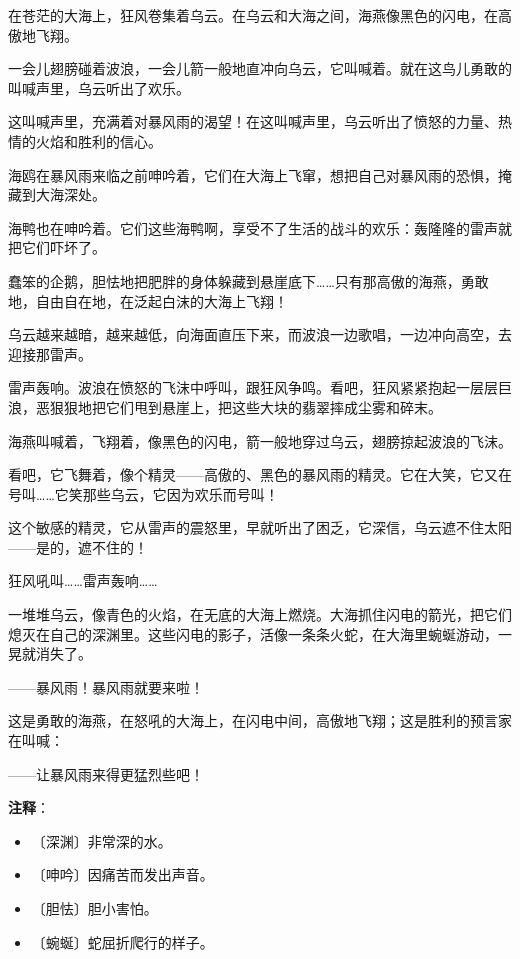 \documentclass[12pt,UTF-8,openany]{ctexbook}
\begin{document}
\begin{large}
    
    在苍茫的大海上，狂风卷集着乌云。在乌云和大海之间，海燕像黑色的闪电，在高傲地飞翔。
    
    一会儿翅膀碰着波浪，一会儿箭一般地直冲向乌云，它叫喊着。就在这鸟儿勇敢的叫喊声里，乌云听出了欢乐。
    
    这叫喊声里，充满着对暴风雨的渴望！在这叫喊声里，乌云听出了愤怒的力量、热情的火焰和胜利的信心。
    
    海鸥在暴风雨来临之前呻吟着，它们在大海上飞窜，想把自己对暴风雨的恐惧，掩藏到大海深处。
    
    海鸭也在呻吟着。它们这些海鸭啊，享受不了生活的战斗的欢乐：轰隆隆的雷声就把它们吓坏了。
    
    蠢笨的企鹅，胆怯地把肥胖的身体躲藏到悬崖底下……只有那高傲的海燕，勇敢地，自由自在地，在泛起白沫的大海上飞翔！
    
    乌云越来越暗，越来越低，向海面直压下来，而波浪一边歌唱，一边冲向高空，去迎接那雷声。
    
    雷声轰响。波浪在愤怒的飞沫中呼叫，跟狂风争鸣。看吧，狂风紧紧抱起一层层巨浪，恶狠狠地把它们甩到悬崖上，把这些大块的翡翠摔成尘雾和碎末。
    
    海燕叫喊着，飞翔着，像黑色的闪电，箭一般地穿过乌云，翅膀掠起波浪的飞沫。
    
    看吧，它飞舞着，像个精灵——高傲的、黑色的暴风雨的精灵。它在大笑，它又在号叫……它笑那些乌云，它因为欢乐而号叫！
    
    这个敏感的精灵，它从雷声的震怒里，早就听出了困乏，它深信，乌云遮不住太阳——是的，遮不住的！
    
    狂风吼叫……雷声轰响……
    
    一堆堆乌云，像青色的火焰，在无底的大海上燃烧。大海抓住闪电的箭光，把它们熄灭在自己的深渊里。这些闪电的影子，活像一条条火蛇，在大海里蜿蜒游动，一晃就消失了。
    
    ——暴风雨！暴风雨就要来啦！
    
    这是勇敢的海燕，在怒吼的大海上，在闪电中间，高傲地飞翔；这是胜利的预言家在叫喊：
    
    ——让暴风雨来得更猛烈些吧！
    
\end{large}


\newpage

\textbf{注释}：

\vspace{-1em}

\begin{itemize}
    \setlength\itemsep{-0.2em}
    \item 〔深渊〕非常深的水。
    \item 〔呻吟〕因痛苦而发出声音。
    \item 〔胆怯〕胆小害怕。
    \item 〔蜿蜒〕蛇屈折爬行的样子。
\end{itemize}
\end{document}
